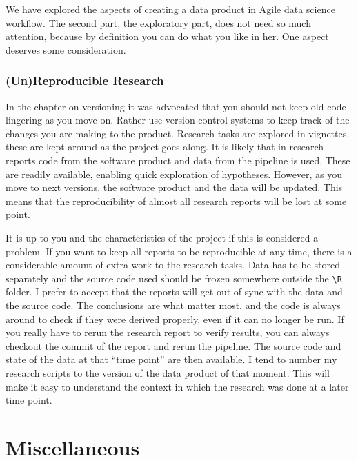 \documentclass[]{book}
\begin{document}
We have explored the aspects of creating a data product in Agile data science workflow. The second part, the exploratory part, does not need so much attention, because by definition you can do what you like in her. One aspect deserves some consideration.

\hypertarget{unreproducible-research}{%
\section{(Un)Reproducible Research}\label{unreproducible-research}}

In the chapter on versioning it was advocated that you should not keep old code lingering as you move on.
Rather use version control systems to keep track of the changes you are making to the product.
Research tasks are explored in vignettes, these are kept around as the project goes along.
It is likely that in research reports code from the software product and data from the pipeline is used.
These are readily available, enabling quick exploration of hypotheses.
However, as you move to next versions, the software product and the data will be updated.
This means that the reproducibility of almost all research reports will be lost at some point.

It is up to you and the characteristics of the project if this is considered a problem.
If you want to keep all reports to be reproducible at any time, there is a considerable amount of extra work to the research tasks.
Data has to be stored separately and the source code used should be frozen somewhere outside the \texttt{\textbackslash{}R} folder.
I prefer to accept that the reports will get out of sync with the data and the source code.
The conclusions are what matter most, and the code is always around to check if they were derived properly, even if it can no longer be run.
If you really have to rerun the research report to verify results, you can always checkout the commit of the report and rerun the pipeline.
The source code and state of the data at that ``time point'' are then available.
I tend to number my research scripts to the version of the data product of that moment.
This will make it easy to understand the context in which the research was done at a later time point.

\hypertarget{part-miscellaneous}{%
\part{Miscellaneous}\label{part-miscellaneous}}
\end{document}
